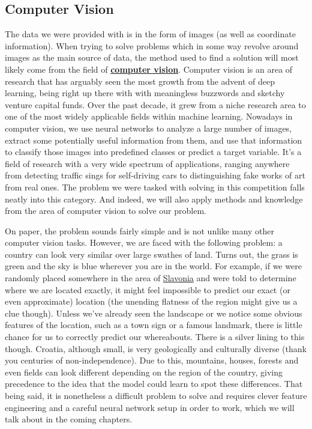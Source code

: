 \documentclass[]{article}
\begin{document}
\hypertarget{computer-vision}{%
\subsection{Computer Vision}\label{computer-vision}}

The data we were provided with is in the form of images (as well as
coordinate information). When trying to solve problems which in some way
revolve around images as the main source of data, the method used to
find a solution will most likely come from the field of
\protect\hyperlink{computer-vision}{\textbf{computer vision}}. Computer
vision is an area of research that has arguably seen the most growth
from the advent of deep learning, being right up there with with
meaningless buzzwords and sketchy venture capital funds. Over the past
decade, it grew from a niche research area to one of the most widely
applicable fields within machine learning. Nowadays in computer vision,
we use neural networks to analyze a large number of images, extract some
potentially useful information from them, and use that information to
classify those images into predefined classes or predict a target
variable. It's a field of research with a very wide spectrum of
applications, ranging anywhere from detecting traffic sings for
self-driving cars to distinguishing fake works of art from real ones.
The problem we were tasked with solving in this competition falls neatly
into this category. And indeed, we will also apply methods and knowledge
from the area of computer vision to solve our problem.

On paper, the problem sounds fairly simple and is not unlike many other
computer vision tasks. However, we are faced with the following problem:
a country can look very similar over large swathes of land. Turns out,
the grass is green and the sky is blue wherever you are in the world.
For example, if we were randomly placed somewhere in the area of
\href{https://www.google.com/maps/@45.4743188,17.5110713,8.75z}{Slavonia}
and were told to determine where we are located exactly, it might feel
impossible to predict our exact (or even approximate) location (the
unending flatness of the region might give us a clue though). Unless
we've already seen the landscape or we notice some obvious features of
the location, such as a town sign or a famous landmark, there is little
chance for us to correctly predict our whereabouts. There is a silver
lining to this though. Croatia, although small, is very geologically and
culturally diverse (thank you centuries of non-independence). Due to
this, mountains, houses, forests and even fields can look different
depending on the region of the country, giving precedence to the idea
that the model could learn to spot these differences. That being said,
it is nonetheless a difficult problem to solve and requires clever
feature engineering and a careful neural network setup in order to work,
which we will talk about in the coming chapters.
\end{document}

